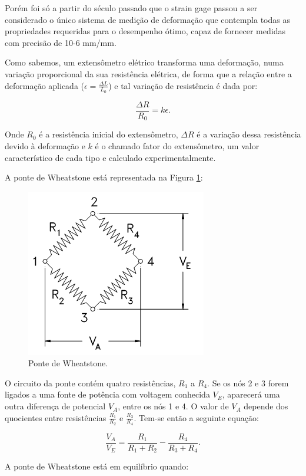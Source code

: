 Porém foi só a partir do século passado que o strain gage passou a ser considerado o único sistema de medição de deformação que contempla todas as propriedades requeridas para o desempenho ótimo, capaz de fornecer medidas com precisão de 10-6 mm/mm.

Como sabemos, um extensômetro elétrico transforma uma deformação, numa variação proporcional da sua resistência elétrica, de forma que a relação entre a deformação aplicada ($\epsilon = \frac{\Delta L}{L_0}$) e tal variação de resistência é dada por: 

\[ 
    \frac{\Delta R}{R_0} = k \epsilon.
\]

Onde $R_0$ é a resistência inicial do extensômetro, $\Delta R$ é a variação dessa resistência devido à deformação e $k$ é o chamado fator do extensômetro, um valor
característico de cada tipo e calculado experimentalmente.

A ponte de Wheatstone está representada na Figura \ref{f_fi2}:

\begin{figure}[H]
    \centering
    \includegraphics[scale=0.5]{img/fi2.png}
    \caption{Ponte de Wheatstone.}
    \label{f_fi2}
\end{figure}

O circuito da ponte contém quatro resistências, $R_1$ a $R_4$. Se os nós 2 e 3 forem ligados a uma fonte de potência com voltagem conhecida $V_E$, aparecerá uma outra diferença de potencial $V_A$, entre os nós 1 e 4. O valor de $V_A$ depende dos quocientes entre resistências $\frac{R_1}{R_2}$ e $\frac{R_3}{R_4}$. Tem-se então a seguinte equação: 

\[
\frac{V_A}{V_E} = \frac{R_1}{R_1 + R_2} - \frac{R_4}{R_3 + R_4}.
\]

A ponte de Wheatstone está em equilíbrio quando:

